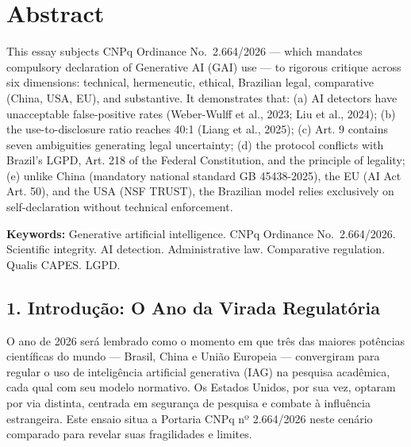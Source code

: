 \documentclass[
  12pt,
  a4paper,
  brazil
]{article}
\begin{document}
\section{Abstract}\label{abstract}

This essay subjects CNPq Ordinance No.~2.664/2026 --- which mandates
compulsory declaration of Generative AI (GAI) use --- to rigorous
critique across six dimensions: technical, hermeneutic, ethical,
Brazilian legal, comparative (China, USA, EU), and substantive. It
demonstrates that: (a) AI detectors have unacceptable false-positive
rates (Weber-Wulff et al., 2023; Liu et al., 2024); (b) the
use-to-disclosure ratio reaches 40:1 (Liang et al., 2025); (c) Art. 9
contains seven ambiguities generating legal uncertainty; (d) the
protocol conflicts with Brazil's LGPD, Art. 218 of the Federal
Constitution, and the principle of legality; (e) unlike China (mandatory
national standard GB 45438-2025), the EU (AI Act Art. 50), and the USA
(NSF TRUST), the Brazilian model relies exclusively on self-declaration
without technical enforcement.

\textbf{Keywords:} Generative artificial intelligence. CNPq Ordinance
No.~2.664/2026. Scientific integrity. AI detection. Administrative law.
Comparative regulation. Qualis CAPES. LGPD.

\subsection{1. Introdução: O Ano da Virada
Regulatória}\label{introduuxe7uxe3o-o-ano-da-virada-regulatuxf3ria}

O ano de 2026 será lembrado como o momento em que três das maiores
potências científicas do mundo --- Brasil, China e União Europeia ---
convergiram para regular o uso de inteligência artificial generativa
(IAG) na pesquisa acadêmica, cada qual com seu modelo normativo. Os
Estados Unidos, por sua vez, optaram por via distinta, centrada em
segurança de pesquisa e combate à influência estrangeira. Este ensaio
situa a Portaria CNPq nº 2.664/2026 neste cenário comparado para revelar
suas fragilidades e limites.
\end{document}
